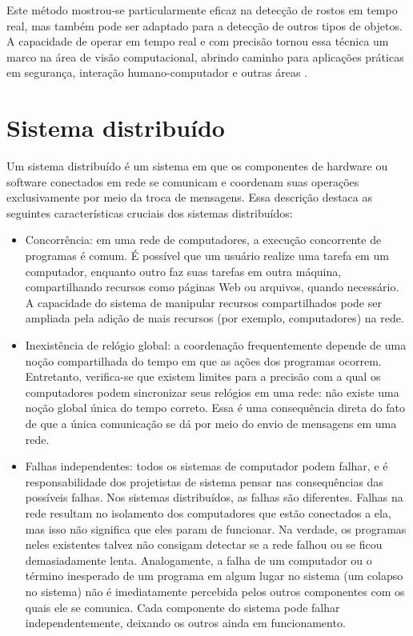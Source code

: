 \documentclass[12pt, %
openright, 
oneside, %
a4paper,    %
brazil]{facom-ufu-abntex2}
\begin{document}
Este método mostrou-se particularmente eficaz na detecção de rostos em tempo
real, mas também pode ser adaptado para a detecção de outros tipos de objetos.
A capacidade de operar em tempo real e com precisão tornou essa técnica um
marco na área de visão computacional, abrindo caminho para aplicações práticas
em segurança, interação humano-computador e outras áreas \cite{990517}.

\section{Sistema distribuído}

Um sistema distribuído é um sistema em que os componentes de hardware ou
software conectados em rede se comunicam e coordenam suas operações
exclusivamente por meio da troca de mensagens. Essa descrição destaca as
seguintes características cruciais dos sistemas distribuídos:

\begin{itemize}
	\item Concorrência: em uma rede de computadores, a execução concorrente
	      de programas é comum. É possível que um usuário realize uma tarefa em um
	      computador, enquanto outro faz suas tarefas em outra máquina, compartilhando
	      recursos como páginas Web ou arquivos, quando necessário. A capacidade do
	      sistema de manipular recursos compartilhados pode ser ampliada pela adição de
	      mais recursos (por exemplo, computadores) na rede.
	\item Inexistência de relógio global: a coordenação frequentemente
	      depende de uma noção compartilhada do tempo em que as ações dos programas
	      ocorrem. Entretanto, verifica-se que existem limites para a precisão com a qual
	      os computadores podem sincronizar seus relógios em uma rede: não existe uma
	      noção global única do tempo correto. Essa é uma consequência direta do fato de
	      que a única comunicação se dá por meio do envio de mensagens em uma rede.
	\item Falhas independentes: todos os sistemas de computador podem
	      falhar, e é responsabilidade dos projetistas de sistema pensar nas
	      consequências das possíveis falhas. Nos sistemas distribuídos, as falhas são
	      diferentes. Falhas na rede resultam no isolamento dos computadores que estão
	      conectados a ela, mas isso não significa que eles param de funcionar. Na
	      verdade, os programas neles existentes talvez não consigam detectar se a rede
	      falhou ou se ficou demasiadamente lenta. Analogamente, a falha de um computador
	      ou o término inesperado de um programa em algum lugar no sistema (um colapso no
	      sistema) não é imediatamente percebida pelos outros componentes com os quais
	      ele se comunica. Cada componente do sistema pode falhar independentemente,
	      deixando os outros ainda em funcionamento.
\end{itemize}
\end{document}
